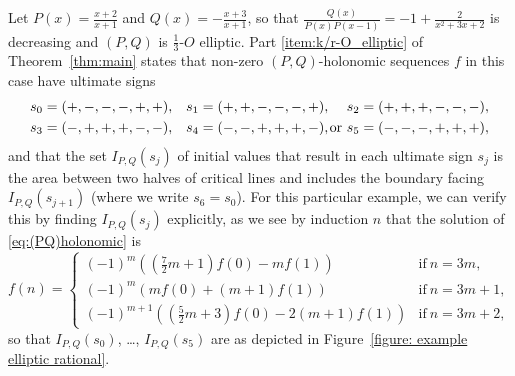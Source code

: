 \documentclass[a4paper,UKenglish,cleveref,autoref,thm-restate]{lipics-v2021}
\begin{document}
\begin{example}\label{ex:}
Let $P(x) = \frac{x+2}{x+1}$ and $Q(x) = - \frac{x+3}{x+1}$, 
so that $\frac{Q(x)}{P(x)P(x-1)} = -1 + \frac2{x^2 + 3x + 2}$ is decreasing 
and $(P, Q)$ is $\frac13$-$O$ elliptic. 
Part \eqref{item:k/r-O_elliptic} of Theorem~\ref{thm:main}
states that
non-zero $(P, Q)$-holonomic sequences $f$ in this case
have ultimate signs 
\begin{align}
\label{equation: ultimate sign example elliptic rational}
    s _0 & = (+, -, -, -, +, +), &
    s _1 & = (+, +, -, -, -, +), &
    s _2 & = (+, +, +, -, -, -), 
 \notag
 \\ 
    s _3 & = (-, +, +, +, -, -), &
    s _4 & = (-, -, +, +, +, -), & \llap{or} \
    s _5 & = (-, -, -, +, +, +), 
\end{align} 
and that the set $I_{P, Q}(s_j)$ of initial values that result in each ultimate sign $s _j$
is the area between two halves of critical lines and includes the boundary facing $I_{P, Q}(s_{j+1})$
(where we write $s _6 = s _0$). 
For this particular example, 
we can verify this by finding $I_{P, Q}(s_j)$ explicitly, 
as we see by induction $n$ that 
the solution of \eqref{eq:(PQ)holonomic} is
\begin{equation}\label{eq:Baku_Koki}
f(n) = \begin{cases}
(-1)^m \left( \left( \frac72 m + 1 \right) f(0) - m f(1) \right) & \text{if} \ n = 3m, \\
(-1)^m \left( m f(0) + (m+1) f(1) \right) & \text{if} \ n = 3m+1, \\
(-1)^{m+1} \left( \left( \frac52 m + 3 \right) f(0) - 2(m+1) f(1) \right) & \text{if} \ n = 3m+2, 
\end{cases}
\end{equation}
so that $I_{P, Q}(s_0)$, \ldots, $I_{P, Q}(s_5)$ are as depicted in Figure~\ref{figure: example elliptic rational}. 
\begin{figure}[t]
\begin{center}
\end{center}
\end{figure}
\end{example}
\end{document}
